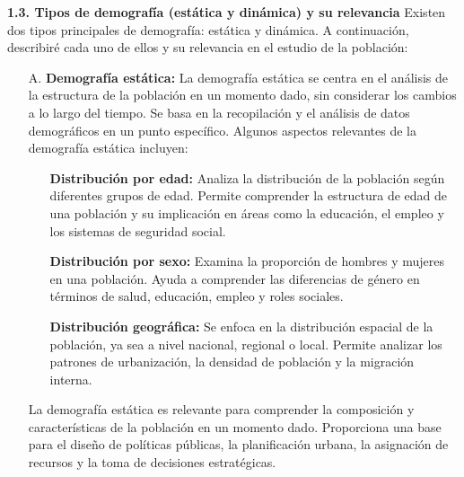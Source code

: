 \documentclass[8pt,a4paper]{beamer}
\begin{document}
{\begin{frame}{}
\begin{block}{}
\end{block}

\end{frame}


\begin{frame}{}
\begin{block}{\textbf{1.3. Tipos de demografía (estática y dinámica) y su relevancia}}
\justifying
Existen dos tipos principales de demografía: estática y dinámica. A continuación, describiré cada uno de ellos y su relevancia en el estudio de la población:
\begin{enumerate}
\justifying
\item[A.] \textbf{Demografía estática:} La demografía estática se centra en el análisis de la estructura de la población en un momento dado, sin considerar los cambios a lo largo del tiempo. Se basa en la recopilación y el análisis de datos demográficos en un punto específico. Algunos aspectos relevantes de la demografía estática incluyen:
\begin{itemize}
\justifying
\item[\ding{99}] \textbf{Distribución por edad:} Analiza la distribución de la población según diferentes grupos de edad. Permite comprender la estructura de edad de una población y su implicación en áreas como la educación, el empleo y los sistemas de seguridad social.

\item[\ding{99}] \textbf{Distribución por sexo:} Examina la proporción de hombres y mujeres en una población. Ayuda a comprender las diferencias de género en términos de salud, educación, empleo y roles sociales.

\item[\ding{99}] \textbf{Distribución geográfica:} Se enfoca en la distribución espacial de la población, ya sea a nivel nacional, regional o local. Permite analizar los patrones de urbanización, la densidad de población y la migración interna.
\end{itemize}
La demografía estática es relevante para comprender la composición y características de la población en un momento dado. Proporciona una base para el diseño de políticas públicas, la planificación urbana, la asignación de recursos y la toma de decisiones estratégicas.
\end{enumerate}
\end{block}

\end{frame}

}
\end{document}
